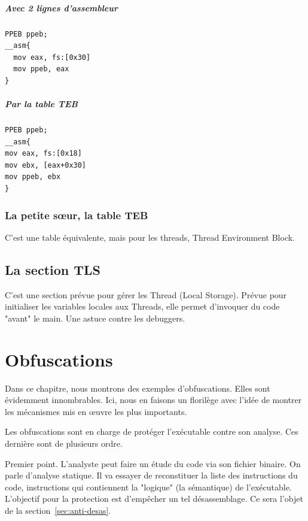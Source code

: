 \documentclass{book}
\begin{document}
\paragraph{Avec 2 lignes d'assembleur}

\begin{verbatim}
PPEB ppeb;
__asm{
  mov eax, fs:[0x30]
  mov ppeb, eax
}
\end{verbatim}

\paragraph{Par la table TEB}

\begin{verbatim}
PPEB ppeb;
__asm{
mov eax, fs:[0x18]
mov ebx, [eax+0x30]
mov ppeb, ebx
}
\end{verbatim}

\subsection{La petite s\oe ur, la table TEB}

C'est une table équivalente, mais pour les threads, Thread Environment Block. 

\section{La section TLS}

C'est une section prévue pour gérer les Thread (Local Storage). Prévue pour initialiser les variables locales aux Threads, elle permet d'invoquer du code "avant" le main. Une astuce contre les debuggers. 



\chapter{Obfuscations}

Dans ce chapitre, nous montrons des exemples d'obfuscations. Elles sont évidemment innombrables. Ici, nous en faisons un florilège avec l'idée de montrer les mécanismes mis en \oe uvre les plus importants. 

Les obfuscations sont en charge de protéger l'exécutable contre son analyse. Ces dernière sont de plusieurs ordre. 

Premier point. L'analyste peut faire un étude du code via son fichier binaire. On parle d'analyse statique. Il va essayer de reconstituer la liste des instructions du code, instructions qui contiennent la "logique" (la sémantique) de l'exécutable. L'objectif pour la protection est d'empêcher un tel désassemblage. Ce sera l'objet de la section~\ref{sec:anti-desas}. 
\end{document}
